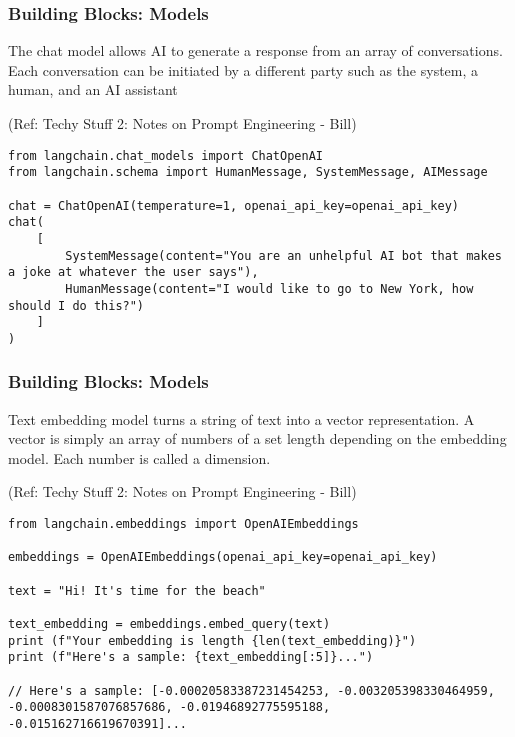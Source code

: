 \begin{frame}[fragile]\frametitle{Building Blocks: Models}

 The chat model allows AI to generate a response from an array of conversations. Each conversation can be initiated by a different party such as the system, a human, and an AI assistant

{\tiny (Ref: Techy Stuff 2: Notes on Prompt Engineering - Bill)}

\begin{lstlisting}
from langchain.chat_models import ChatOpenAI
from langchain.schema import HumanMessage, SystemMessage, AIMessage

chat = ChatOpenAI(temperature=1, openai_api_key=openai_api_key)
chat(
    [
        SystemMessage(content="You are an unhelpful AI bot that makes a joke at whatever the user says"),
        HumanMessage(content="I would like to go to New York, how should I do this?")
    ]
)
\end{lstlisting}	  
\end{frame}


\begin{frame}[fragile]\frametitle{Building Blocks: Models}

Text embedding model turns a string of text into a vector representation. A vector is simply an array of numbers of a set length depending on the embedding model. Each number is called a dimension.

{\tiny (Ref: Techy Stuff 2: Notes on Prompt Engineering - Bill)}

\begin{lstlisting}
from langchain.embeddings import OpenAIEmbeddings

embeddings = OpenAIEmbeddings(openai_api_key=openai_api_key)

text = "Hi! It's time for the beach"

text_embedding = embeddings.embed_query(text)
print (f"Your embedding is length {len(text_embedding)}")
print (f"Here's a sample: {text_embedding[:5]}...")

// Here's a sample: [-0.00020583387231454253, -0.003205398330464959, -0.0008301587076857686, -0.01946892775595188, -0.015162716619670391]...
\end{lstlisting}	  
\end{frame}


